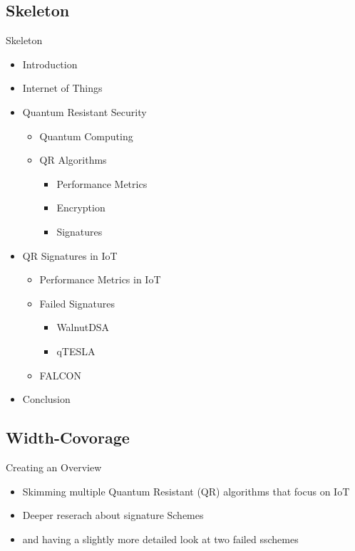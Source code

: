 \documentclass[ucs,10pt]{beamer}
\begin{document}
\subsection{Skeleton}

\begin{frame}{Skeleton}
  \begin{itemize}
      \item Introduction
    
      \item Internet of Things
      
      \item Quantum Resistant Security
          \begin{itemize}
            \item Quantum Computing
            \item QR Algorithms
            \begin{itemize}
              \item Performance Metrics
              \item Encryption
              \item Signatures
            \end{itemize}
          \end{itemize}
      
      \item QR Signatures in IoT 
      \begin{itemize}
        \item Performance Metrics in IoT
        \item Failed Signatures
        \begin{itemize}
          \item WalnutDSA
          \item qTESLA
        \end{itemize}
        \item FALCON
      \end{itemize}
      
      
      \item {Conclusion}
  \end{itemize}
  
\end{frame}

\subsection{Width-Covorage}
\begin{frame}{Creating an Overview}
  \begin{itemize}
    \item Skimming multiple Quantum Resistant (QR) algorithms \cite{QR_algs,PQClean-GH} that focus on IoT \cite{QR_comparison,Energy_comp,QR_Iot_Lattice,QR_IoT,QR_IoT_Energy} 
    \item Deeper reserach about signature Schemes \cite{QR_sigs}
    \item and having a slightly more detailed look at two failed sschemes \cite{WalnutDSA,WalnutDSA_broken,qtesla,qtesla_masked}
    
  \end{itemize}
\end{frame}
\end{document}
